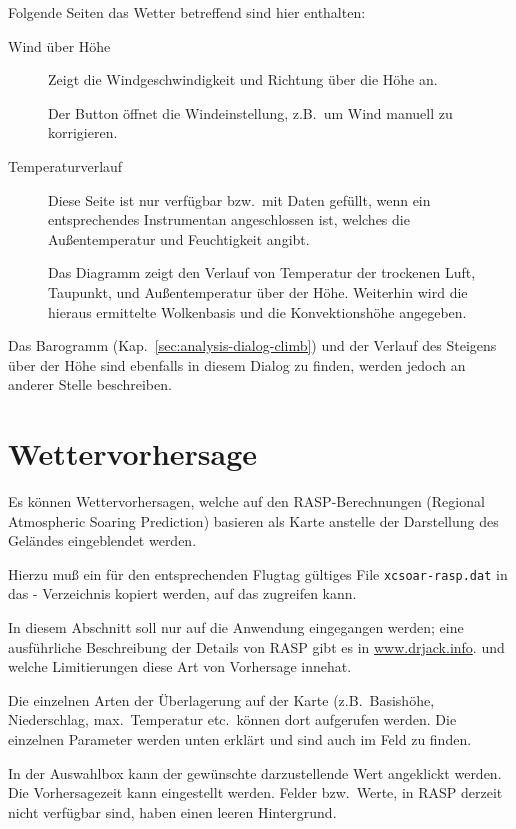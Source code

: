 Folgende Seiten das Wetter betreffend sind hier enthalten:
\begin{description}
\item[Wind über Höhe]
Zeigt die Windgeschwindigkeit und Richtung über die Höhe an.

Der Button  öffnet die Windeinstellung, z.B.\ um Wind manuell zu korrigieren.

\item[Temperaturverlauf]
 Diese Seite ist nur verfügbar bzw.\ mit Daten gefüllt, wenn ein entsprechendes Instrumentan  \xc angeschlossen ist, welches die Außentemperatur und Feuchtigkeit angibt.

Das Diagramm zeigt den Verlauf von Temperatur der trockenen Luft, Taupunkt, und Außentemperatur
über der Höhe. Weiterhin wird die hieraus ermittelte Wolkenbasis und die Konvektionshöhe  angegeben.


\end{description}
Das Barogramm (Kap.~\ref{sec:analysis-dialog-climb}) und der Verlauf des Steigens über der Höhe sind
ebenfalls in diesem Dialog zu finden, werden jedoch an anderer Stelle beschreiben.

\section{Wettervorhersage}
Es können Wettervorhersagen, welche auf den RASP-Berechnungen (Regional Atmospheric
Soaring Prediction) basieren als Karte anstelle der Darstellung des Geländes eingeblendet werden.

Hierzu muß ein für den entsprechenden Flugtag gültiges File \verb"xcsoar-rasp.dat"  in
das \xc - Verzeichnis kopiert werden, auf das  \xc zugreifen kann.

In diesem Abschnitt soll nur auf die Anwendung eingegangen werden; eine ausführliche
Beschreibung der Details von RASP gibt es in  \url{www.drjack.info}.
und welche Limitierungen diese Art von Vorhersage innehat.

Die einzelnen Arten der Überlagerung auf der Karte (z.B.\ Basishöhe, Niederschlag,
max.\ Temperatur etc.\  können dort aufgerufen werden.
Die einzelnen Parameter werden unten erklärt und sind auch im Feld  zu finden.

In der Auswahlbox kann der gewünschte darzustellende Wert angeklickt werden.
Die Vorhersagezeit kann eingestellt werden. Felder bzw.\ Werte, in RASP derzeit nicht verfügbar sind,
haben einen leeren Hintergrund.

